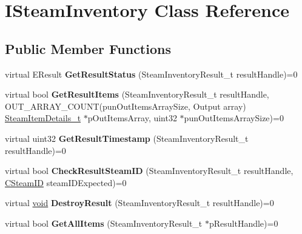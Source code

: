 \hypertarget{classISteamInventory}{}\section{I\+Steam\+Inventory Class Reference}
\label{classISteamInventory}
\subsection*{Public Member Functions}
\begin{DoxyCompactItemize}
\item 
\hypertarget{classISteamInventory_a67b326d7d928ce691411dcc2f09d37ab}{}virtual E\+Result {\bfseries Get\+Result\+Status} (Steam\+Inventory\+Result\+\_\+t result\+Handle)=0\label{classISteamInventory_a67b326d7d928ce691411dcc2f09d37ab}

\item 
\hypertarget{classISteamInventory_ac7b781c85de22e1bc790f36c99ecc231}{}virtual bool {\bfseries Get\+Result\+Items} (Steam\+Inventory\+Result\+\_\+t result\+Handle, O\+U\+T\+\_\+\+A\+R\+R\+A\+Y\+\_\+\+C\+O\+U\+N\+T(pun\+Out\+Items\+Array\+Size, Output array) \hyperlink{structSteamItemDetails__t}{Steam\+Item\+Details\+\_\+t} $\ast$p\+Out\+Items\+Array, uint32 $\ast$pun\+Out\+Items\+Array\+Size)=0\label{classISteamInventory_ac7b781c85de22e1bc790f36c99ecc231}

\item 
\hypertarget{classISteamInventory_a62db5aaa59d5f3dc61b8bed315fcdf3a}{}virtual uint32 {\bfseries Get\+Result\+Timestamp} (Steam\+Inventory\+Result\+\_\+t result\+Handle)=0\label{classISteamInventory_a62db5aaa59d5f3dc61b8bed315fcdf3a}

\item 
\hypertarget{classISteamInventory_a4a21657324ec103d90e5748e76192e3a}{}virtual bool {\bfseries Check\+Result\+Steam\+I\+D} (Steam\+Inventory\+Result\+\_\+t result\+Handle, \hyperlink{classCSteamID}{C\+Steam\+I\+D} steam\+I\+D\+Expected)=0\label{classISteamInventory_a4a21657324ec103d90e5748e76192e3a}

\item 
\hypertarget{classISteamInventory_a66443e508312e8475d88a6de80da180b}{}virtual \hyperlink{SDL__audio_8h_a52835ae37c4bb905b903cbaf5d04b05f}{void} {\bfseries Destroy\+Result} (Steam\+Inventory\+Result\+\_\+t result\+Handle)=0\label{classISteamInventory_a66443e508312e8475d88a6de80da180b}

\item 
\hypertarget{classISteamInventory_a55ee62875c7d7c667bcdf730e70512ac}{}virtual bool {\bfseries Get\+All\+Items} (Steam\+Inventory\+Result\+\_\+t $\ast$p\+Result\+Handle)=0\label{classISteamInventory_a55ee62875c7d7c667bcdf730e70512ac}


\end{DoxyCompactItemize}
